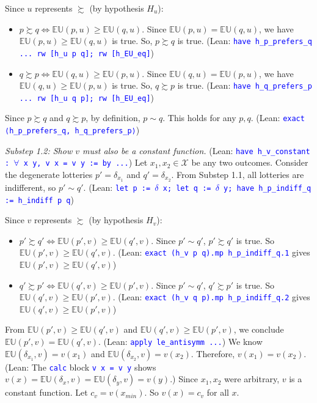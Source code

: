 \documentclass{article}
\theoremstyle{definition}
\newcommand{\X}{\mathcal{X}}
\newcommand{\EU}{\mathbb{EU}}
\newcommand{\tactic}[1]{\textcolor{blue}{\texttt{#1}}}
\newcommand{\pref}{\succsim} %
\newcommand{\indiff}{\sim} %
\begin{document}
    Since $u$ represents $\pref$ (by hypothesis $H_u$):
    \begin{itemize}
        \item $p \pref q \iff \EU(p, u) \ge \EU(q, u)$. Since $\EU(p, u) = \EU(q, u)$, we have $\EU(p, u) \ge \EU(q, u)$ is true. So, $p \pref q$ is true. (Lean: \tactic{have h\_p\_prefers\_q ... rw [h\_u p q]; rw [h\_EU\_eq]})
        \item $q \pref p \iff \EU(q, u) \ge \EU(p, u)$. Since $\EU(q, u) = \EU(p, u)$, we have $\EU(q, u) \ge \EU(p, u)$ is true. So, $q \pref p$ is true. (Lean: \tactic{have h\_q\_prefers\_p ... rw [h\_u q p]; rw [h\_EU\_eq]})
    \end{itemize}
    Since $p \pref q$ and $q \pref p$, by definition, $p \indiff q$. This holds for any $p,q$.
    (Lean: \tactic{exact ⟨h\_p\_prefers\_q, h\_q\_prefers\_p⟩})

    \textit{Substep 1.2: Show $v$ must also be a constant function.}
    (Lean: \tactic{have h\_v\_constant : $\forall$ x y, v x = v y := by ...})
    Let $x_1, x_2 \in \X$ be any two outcomes. Consider the degenerate lotteries $p' = \delta_{x_1}$ and $q' = \delta_{x_2}$.
    From Substep 1.1, all lotteries are indifferent, so $p' \indiff q'$.
    (Lean: \tactic{let p := $\delta$ x; let q := $\delta$ y; have h\_p\_indiff\_q := h\_indiff p q})

    Since $v$ represents $\pref$ (by hypothesis $H_v$):
    \begin{itemize}
        \item $p' \pref q' \iff \EU(p', v) \ge \EU(q', v)$. Since $p' \indiff q'$, $p' \pref q'$ is true. So $\EU(p', v) \ge \EU(q', v)$.
        (Lean: \tactic{exact (h\_v p q).mp h\_p\_indiff\_q.1} gives $\EU(p',v) \ge \EU(q',v)$)
        \item $q' \pref p' \iff \EU(q', v) \ge \EU(p', v)$. Since $p' \indiff q'$, $q' \pref p'$ is true. So $\EU(q', v) \ge \EU(p', v)$.
        (Lean: \tactic{exact (h\_v q p).mp h\_p\_indiff\_q.2} gives $\EU(q',v) \ge \EU(p',v)$)
    \end{itemize}
    From $\EU(p', v) \ge \EU(q', v)$ and $\EU(q', v) \ge \EU(p', v)$, we conclude $\EU(p', v) = \EU(q', v)$.
    (Lean: \tactic{apply le\_antisymm ...})
    We know $\EU(\delta_{x_1}, v) = v(x_1)$ and $\EU(\delta_{x_2}, v) = v(x_2)$.
    Therefore, $v(x_1) = v(x_2)$.
    (Lean: The \tactic{calc} block \tactic{v x = v y} shows $v(x) = \EU(\delta_x,v) = \EU(\delta_y,v) = v(y)$.)
    Since $x_1, x_2$ were arbitrary, $v$ is a constant function. Let $c_v = v(x_{min})$. So $v(x) = c_v$ for all $x$.
\end{document}
